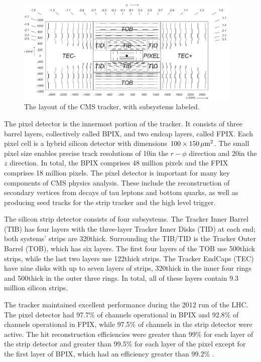 \begin{figure}[hbt]
\begin{center}
\includegraphics[width=0.95\textwidth]{figures/CMS_tracker.pdf}
\caption{The layout of the CMS tracker, with subsystems labeled.}
\label{fig:tk-layout}
\end{center}
\end{figure}

The pixel detector is the innermost portion of the tracker. It consists of three barrel layers, collectively called BPIX, and two endcap layers, called FPIX. Each pixel cell is a hybrid silicon detector with dimensions $100\times150\,\mu\text{m}^{2}$. The small pixel size enables precise track resolutions of 10\mum in the $r-\phi$ direction and 20\mum in the $z$ direction. In total, the BPIX comprises 48 million pixels and the FPIX comprises 18 million pixels. The pixel detector is important for many key components of CMS physics analysis. These include the reconstruction of secondary vertices from decays of tau leptons and bottom quarks, as well as producing seed tracks for the strip tracker and the high level trigger.

The silicon strip detector consists of four subsystems. The Tracker Inner Barrel (TIB) has four layers with the three-layer Tracker Inner Disks (TID) at each end; both systems' strips are 320\mum thick. Surrounding the TIB/TID is the Tracker Outer Barrel (TOB), which has six layers. The first four layers of the TOB use 500\mum thick strips, while the last two layers use 122\mum thick strips. The Tracker EndCaps (TEC) have nine disks with up to seven layers of strips, 320\mum thick in the inner four rings and 500\mum thick in the outer three rings. In total, all of these layers contain 9.3 million silicon strips.

The tracker maintained excellent performance during the 2012 run of the LHC. The pixel detector had 97.7\% of channels operational in BPIX and 92.8\% of channels operational in FPIX, while 97.5\% of channels in the strip detector were active. The hit reconstruction efficiencies were greater than 99\% for each layer of the strip detector and greater than 99.5\% for each layer of the pixel except for the first layer of BPIX, which had an efficiency greater than 99.2\% \cite{Veszpremi:2014hpa}. 

